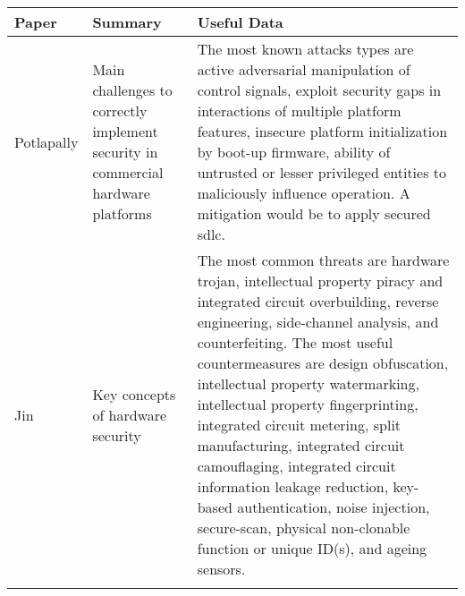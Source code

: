 \begin{small}
\begin{landscape}
	\newpage

	\begin{tabularx}{\linewidth}{p{1.5cm}|p{3cm}X}
		\toprule[0.8mm]
		\textbf{Paper} & \textbf{Summary} & \textbf{Useful Data} \\
		\midrule[0.8mm]
		Potlapally \cite{potlapally_hardware_2011} & Main challenges to correctly implement security in commercial hardware platforms & The most known attacks types are active adversarial manipulation of control signals, exploit security gaps in interactions of multiple platform features, insecure platform initialization by boot-up firmware, ability of untrusted or lesser privileged entities to maliciously influence operation. A mitigation would be to apply secured \gls{sdlc}. \\
		\midrule
		Jin \cite{jin_introduction_2015} & Key concepts of hardware security & The most common threats are hardware trojan, intellectual property piracy and integrated circuit overbuilding, reverse engineering, side-channel analysis, and counterfeiting. The most useful countermeasures are design obfuscation, intellectual property watermarking, intellectual property fingerprinting, integrated circuit metering, split manufacturing, integrated circuit camouflaging, integrated circuit information leakage reduction, key-based authentication, noise injection, secure-scan, physical non-clonable function or unique ID(s), and ageing sensors. \\
		\bottomrule[0.8mm]
		\caption{Hardware attacks and mitigations comparison}
		\label{table:state_review_results_hardware}
	\end{tabularx} %

	\newpage
	

\end{landscape}
\end{small}
